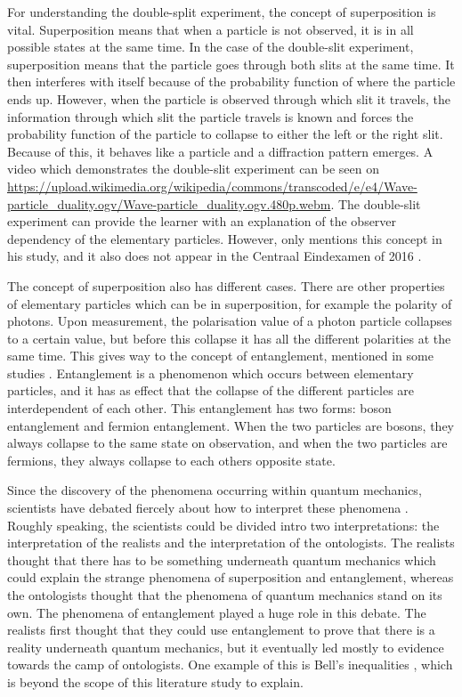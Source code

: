 \documentclass[11pt,twoside]{report} %
\begin{document}
For understanding the double-split experiment, the concept of superposition is vital. Superposition means that when a particle is not observed, it is in all possible states at the same time. In the case of the double-slit experiment, superposition means that the particle goes through both slits at the same time. It then interferes with itself because of the probability function of where the particle ends up. However, when the particle is observed through which slit it travels, the information through which slit the particle travels is known and forces the probability function of the particle to collapse to either the left or the right slit. Because of this, it behaves like a particle and a diffraction pattern emerges. A video which demonstrates the double-slit experiment can be seen on \url{https://upload.wikimedia.org/wikipedia/commons/transcoded/e/e4/Wave-particle_duality.ogv/Wave-particle_duality.ogv.480p.webm}. The double-slit experiment can provide the learner with an explanation of the observer dependency of the elementary particles. However, only  mentions this concept in his study, and it also does not appear in the Centraal Eindexamen of 2016 \cite{eindexamen2016}.

The concept of superposition also has different cases. There are other properties of elementary particles which can be in superposition, for example the polarity of photons. Upon measurement, the polarisation value of a photon particle collapses to a certain value, but before this collapse it has all the different polarities at the same time. This gives way to the concept of entanglement, mentioned in some studies \cite{henriksen, hobson, kuttner}. Entanglement is a phenomenon which occurs between elementary particles, and it has as effect that the collapse of the different particles are interdependent of each other. This entanglement has two forms: boson entanglement and fermion entanglement. When the two particles are bosons, they always collapse to the same state on observation, and when the two particles are fermions, they always collapse to each others opposite state.

Since the discovery of the phenomena occurring within quantum mechanics, scientists have debated fiercely about how to interpret these phenomena \cite{barnes}. Roughly speaking, the scientists could be divided intro two interpretations: the interpretation of the realists and the interpretation of the ontologists. The realists thought that there has to be something underneath quantum mechanics which could explain the strange phenomena of superposition and entanglement, whereas the ontologists thought that the phenomena of quantum mechanics stand on its own. The phenomena of entanglement played a huge role in this debate. The realists first thought that they could use entanglement to prove that there is a reality underneath quantum mechanics, but it eventually led mostly to evidence towards the camp of ontologists. One example of this is Bell's inequalities \cite{kuttner, muller}, which is beyond the scope of this literature study to explain.
\end{document}
